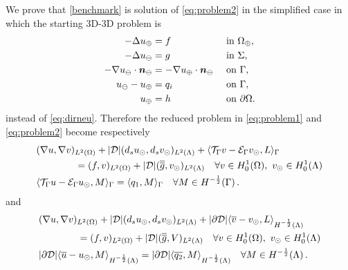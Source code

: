 \documentclass[r]{siamart171218}
\begin{document}
We prove that \eqref{benchmark} is solution of \eqref{eq:problem2} in the
simplified case in which the starting 3D-3D problem is
\begin{subequations}\label{eq:dirneu_simple}
\begin{align}
- \Delta u_{\oplus}  &= f  && \text{ in } \Omega_{\oplus},\\
- \Delta u_{\ominus} &= g  && \text{ in } \Sigma,\\
-\nabla u_{\ominus} \cdot \boldsymbol n_{\ominus} &= -\nabla u_{\oplus} \cdot \boldsymbol n_{\ominus}  && \text{ on } \Gamma,\\
u_{\ominus} - u_{\oplus} &= q_i  && \text{ on }  \Gamma,\\
u_{\oplus} &= h && \text{ on } \partial \Omega.
\end{align}
\end{subequations}
instead of \eqref{eq:dirneu}. Therefore the reduced problem in \eqref{eq:problem1} and
\eqref{eq:problem2} become respectively
%
\begin{subequations}\label{eq:problem1_simple}
\begin{align}
\label{eq:problem1_simple_eq1}
&(\nabla u,\nabla v)_{L^2(\Omega)} + |{\cal D}|(d_s \ud,d_s \vd)_{L^2(\Lambda)} 
+ \langle \mathcal{T}_{\Gamma} v  - \mathcal{E}_{\Gamma} \vd, L \rangle_\Gamma
\\
\nonumber
&\qquad\qquad= (f,v)_{L^2(\Omega)} + |{\cal D}| (\avrd{g},\vd)_{L^2(\Lambda)}
\quad \forall v \in H^1_0(\Omega), \ \vd \in H^1_0(\Lambda)
\\
\label{eq:problem1_simple_eq2}
&   \langle \mathcal{T}_{\Gamma} u - \mathcal{E}_{\Gamma} \ud , M \rangle_\Gamma =  \langle q_1 , M \rangle_\Gamma
\quad \forall M \in H^{-\frac12}(\Gamma)\,.
\end{align}
\end{subequations}
and
\begin{subequations}\label{eq:problem2_simple}
  \begin{align}
    \label{eq:problem2_simple_eq1}
&(\nabla u,\nabla v)_{L^2(\Omega)} + |{\cal D}|(d_s \ud,d_s \vd)_{L^2(\Lambda)} 
+ |{\partial \cal D}| \langle \avrc{v} - \vd, L \rangle_{H^{-\frac12}(\Lambda)} 
\\
\nonumber
&\qquad\qquad= (f,v)_{L^2(\Omega)} + |{\cal D}| (\avrd{g},V)_{L^2(\Lambda)}
\quad \forall v \in H^1_0(\Omega), \ \vd \in H^1_0(\Lambda)
\\
\label{eq:problem2_simple_eq2}
&  |\partial {\cal D}| \langle \avrc{u} -  \ud, M \rangle_{H^{-\frac12}(\Lambda)} =
|\partial {\cal D}| \langle \avrc{q_2}, M \rangle_{H^{-\frac12}(\Lambda)}
\quad \forall M \in H^{-\frac12}(\Lambda)\,.
\end{align}
\end{subequations}
\end{document}
